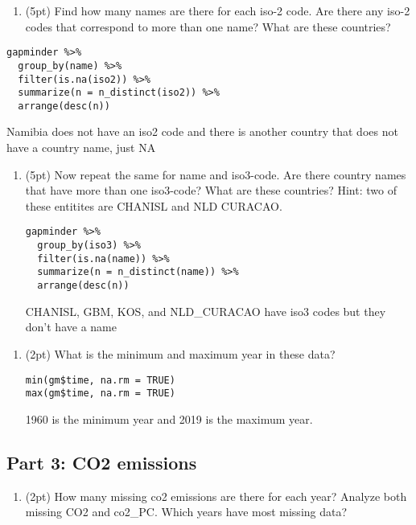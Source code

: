 \documentclass[]{article}
\providecommand{\tightlist}{%
  \setlength{\itemsep}{0pt}\setlength{\parskip}{0pt}}
\begin{document}
\begin{enumerate}
\def\labelenumi{(\alph{enumi})}
\tightlist
\item
  (5pt) Find how many names are there for each iso-2 code. Are there any
  iso-2 codes that correspond to more than one name? What are these
  countries?
\end{enumerate}

\begin{verbatim}
gapminder %>% 
  group_by(name) %>% 
  filter(is.na(iso2)) %>% 
  summarize(n = n_distinct(iso2)) %>% 
  arrange(desc(n))
\end{verbatim}

Namibia does not have an iso2 code and there is another country that
does not have a country name, just NA

\begin{enumerate}
\def\labelenumi{(\alph{enumi})}
\setcounter{enumi}{1}
\item
  (5pt) Now repeat the same for name and iso3-code. Are there country
  names that have more than one iso3-code? What are these countries?
  Hint: two of these entitites are CHANISL and NLD CURACAO.

\begin{verbatim}
gapminder %>% 
  group_by(iso3) %>% 
  filter(is.na(name)) %>% 
  summarize(n = n_distinct(name)) %>% 
  arrange(desc(n))
\end{verbatim}

  CHANISL, GBM, KOS, and NLD\_CURACAO have iso3 codes but they don't
  have a name
\end{enumerate}

\begin{enumerate}
\def\labelenumi{\arabic{enumi}.}
\setcounter{enumi}{2}
\item
  (2pt) What is the minimum and maximum year in these data?

\begin{verbatim}
min(gm$time, na.rm = TRUE)
max(gm$time, na.rm = TRUE)
\end{verbatim}

  1960 is the minimum year and 2019 is the maximum year.
\end{enumerate}

\subsection{Part 3: CO2 emissions}\label{part-3-co2-emissions}

\begin{enumerate}
\def\labelenumi{\arabic{enumi}.}
\tightlist
\item
  (2pt) How many missing co2 emissions are there for each year? Analyze
  both missing CO2 and co2\_PC. Which years have most missing data?
\end{enumerate}
\end{document}
